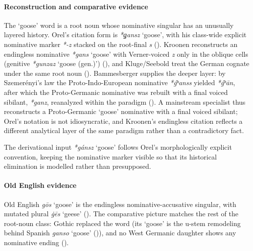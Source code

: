 \documentclass[
  british,
  a4paper,
]{article}
\providecommand{\Recon}[1]{\emph{*#1}}
\begin{document}
\paragraph{Reconstruction and comparative
evidence}\label{reconstruction-and-comparative-evidence-25}

The `goose' word is a root noun whose nominative singular has an
unusually layered history. Orel's citation form is \emph{*ǥansz}
`goose', with his class-wide explicit nominative marker \emph{*-z}
stacked on the root-final \emph{s} (). Kroonen reconstructs an endingless nominative {\emph{*gans}}
`goose' with Verner-voiced \emph{z} only in the oblique cells (genitive
{\emph{*gunzaz}} `goose (gen.)') (), and Kluge/Seebold treat the German cognate under the
same root noun ().
Bammesberger supplies the deeper layer: by Szemerényi's law the
Proto-Indo-European nominative \emph{*ǵʰanss} yielded \emph{*ǵʰān},
after which the Proto-Germanic nominative was rebuilt with a final
voiced sibilant, \emph{*ganz}, reanalyzed within the paradigm
(). A mainstream
specialist thus reconstructs a Proto-Germanic `goose' nominative with a
final voiced sibilant; Orel's notation is not idiosyncratic, and
Kroonen's endingless citation reflects a different analytical layer of
the same paradigm rather than a contradictory fact.

The derivational input \Recon{gánsz} `goose' follows Orel's
morphologically explicit convention, keeping the nominative marker
visible so that its historical elimination is modelled rather than
presupposed.

\paragraph{Old English evidence}\label{old-english-evidence-25}

Old English {\emph{gōs}} `goose' is the endingless nominative-accusative
singular, with mutated plural \emph{ġēs} `geese'
(). The comparative picture
matches the rest of the root-noun class: Gothic replaced the word (its
`goose' is the u-stem remodeling behind Spanish \emph{ganso} `goose'
()), and no West Germanic
daughter shows any nominative ending
().
\end{document}

